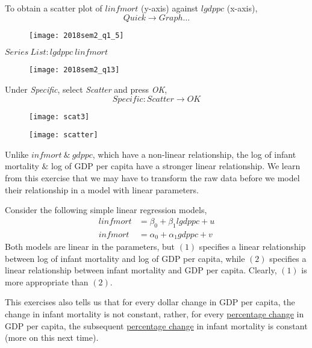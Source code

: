 \documentclass[12pt]{report}
\begin{document}
\noindent To obtain a scatter plot of $linfmort$ (y-axis) against $lgdppc$ (x-axis),
$$Quick \to Graph \dots$$
\begin{figure}[H]
	\centerline{\texttt{[image: 2018sem2\_q1\_5]}}
\end{figure}
\vspace{-\baselineskip} \center $Series\ List: lgdppc\ linfmort$
\begin{figure}[H]
	\centerline{\texttt{[image: 2018sem2\_q13]}}
\end{figure}
\vspace{-\baselineskip} \justify \noindent Under \textit{Specific}, select \textit{Scatter} and press \textit{OK},
$$Specific:Scatter \to OK$$
\begin{figure}[H]
	\centerline{\texttt{[image: scat3]}}
\end{figure}
\vspace{-\baselineskip}	
\begin{figure}[H]
	\centerline{\texttt{[image: scatter]}}
\end{figure}
\vspace{-\baselineskip}	\noindent Unlike $infmort\ \&\ gdppc$, which have a non-linear relationship, the log of infant mortality $\&$ log of GDP per capita have a stronger linear relationship. We learn from this exercise that we may have to transform the raw data before we model their relationship in a model with linear parameters.

\noindent Consider the following simple linear regression models,
\begin{align}
linfmort &= \beta_0 + \beta_1 lgdppc + u \\
infmort &= \alpha_0 + \alpha_1 gdppc + v
\end{align}
\noindent Both models are linear in the parameters, but $(1)$ specifies a linear relationship between log of infant mortality and log of GDP per capita, while $(2)$ specifies a linear relationship between infant mortality and GDP per capita. Clearly, $(1)$ is more appropriate than $(2)$.

\noindent This exercises also tells us that for every dollar change in GDP per capita, the change in infant mortality is not constant, rather, for every \uline{percentage change} in GDP per capita, the subsequent \uline{percentage change} in infant mortality is constant (more on this next time).





\newpage
\end{document}
